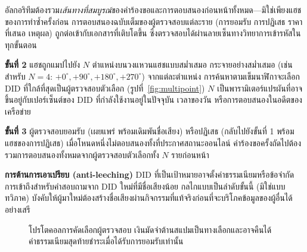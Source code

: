 \documentclass[11pt,a4paper,twocolumn]{article}
\begin{document}
อัลกอริทึมต้องรวม\emph{เส้นทางที่สมบูรณ์}ของคำร้องขอและการตอบสนองก่อนหน้าทั้งหมด---มิใช่เพียงแฮชของการทำซ้ำครั้งก่อน การตอบสนองฉบับเต็มของผู้ตรวจสอบแต่ละราย (การยอมรับ การปฏิเสธ ราคาที่เสนอ เหตุผล) ถูกต่อเข้ากับเอกสารที่เติบโตขึ้น ซึ่งตรวจสอบได้ผ่านลายเซ็นทางวิทยาการเข้ารหัสในทุกขั้นตอน

\textbf{ขั้นที่ 2} แฮชถูกแมปไปยัง $N$ ตำแหน่งบนวงแหวนแฮชแบบสม่ำเสมอ กระจายอย่างสม่ำเสมอ (เช่น สำหรับ $N=4$: $+0^{\circ}, +90^{\circ}, +180^{\circ}, +270^{\circ}$) จากแต่ละตำแหน่ง การค้นหาตามเข็มนาฬิกาจะเลือก DID ที่ใกล้ที่สุดเป็นผู้ตรวจสอบตัวเลือก (รูปที่~\ref{fig:multipoint}) $N$ เป็นพารามิเตอร์แปรผันที่อาจขึ้นอยู่กับเปอร์เซ็นต์ของ DID ที่กำลังใช้งานอยู่ในปัจจุบัน เวลาของวัน หรือการตอบสนองในอดีตของเครือข่าย

\textbf{ขั้นที่ 3} ผู้ตรวจสอบยอมรับ (เผยแพร่ พร้อมเดิมพันชื่อเสียง) หรือปฏิเสธ (กลับไปยังขั้นที่ 1 พร้อมแฮชของการปฏิเสธ) เมื่อโหนดหนึ่งไม่ตอบสนองทั้งที่ประกาศสถานะออนไลน์ คำร้องขอครั้งถัดไปต้องรวมการตอบสนองทั้งหมดจากผู้ตรวจสอบตัวเลือกทั้ง $N$ รายก่อนหน้า

\textbf{การต้านการเอาเปรียบ (anti-leeching)} DID ที่เป็นเป้าหมายอาจตั้งค่าธรรมเนียมหรือข้อจำกัดการเข้าถึงสำหรับคำสอบถามจาก DID ใหม่ที่มีชื่อเสียงน้อย กลไกแบบเป็นลำดับขั้นนี้ (มิใช่แบบทวิภาค) บังคับให้ผู้มาใหม่ต้องสร้างชื่อเสียงผ่านกิจกรรมที่แท้จริงก่อนที่จะบริโภคข้อมูลของผู้อื่นได้อย่างเสรี

\begin{figure}[ht]
\centering
{}
\caption{โปรโตคอลการคัดเลือกผู้ตรวจสอบ เงินมัดจำต้านสแปมเป็นทางเลือกและอาจคืนได้ ค่าธรรมเนียมสุดท้ายชำระเมื่อได้รับการยอมรับเท่านั้น}
\label{fig:verifier}
\end{figure}
\end{document}
